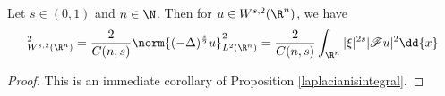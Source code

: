 \documentclass[../main.tex]{subfiles}
\begin{document}
\begin{proposition}\label{fracnormislaplacian}
    Let $ s\in (0,1) $ and $ n\in \N $. Then for $ u\in W^{s,2}(\R^{n}) $, we have 
    \begin{equation}
        [u]_{W^{s,2}(\R^{n})}^{2} = \frac{2}{C(n,s)} \norm{(-\Delta )^{\frac{s}{2}}u}_{L^{2}(\R^{n})}^{2} = \frac{2}{C(n,s)} \int_{\R^{n}} | \xi|^{2s} |\mathscr{F}u|^{2} \dd{x} 
    \end{equation}
\end{proposition}

\begin{proof}
    This is an immediate corollary of Proposition \ref{laplacianisintegral}.
\end{proof}
\end{document}
